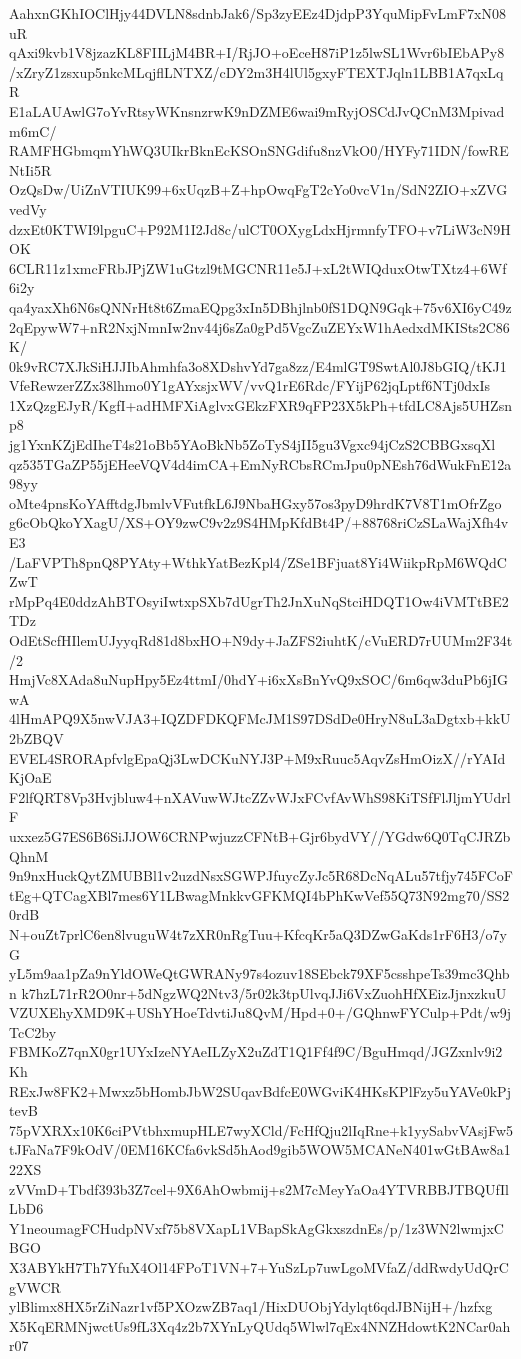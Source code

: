 AahxnGKhIOClHjy44DVLN8sdnbJak6/Sp3zyEEz4DjdpP3YquMipFvLmF7xN08uR
qAxi9kvb1V8jzazKL8FIILjM4BR+I/RjJO+oEceH87iP1z5lwSL1Wvr6bIEbAPy8
/xZryZ1zsxup5nkcMLqjflLNTXZ/cDY2m3H4lUl5gxyFTEXTJqln1LBB1A7qxLqR
E1aLAUAwlG7oYvRtsyWKnsnzrwK9nDZME6wai9mRyjOSCdJvQCnM3Mpivadm6mC/
RAMFHGbmqmYhWQ3UIkrBknEcKSOnSNGdifu8nzVkO0/HYFy71IDN/fowRENtIi5R
OzQsDw/UiZnVTIUK99+6xUqzB+Z+hpOwqFgT2cYo0vcV1n/SdN2ZIO+xZVGvedVy
dzxEt0KTWI9lpguC+P92M1I2Jd8c/ulCT0OXygLdxHjrmnfyTFO+v7LiW3cN9HOK
6CLR11z1xmcFRbJPjZW1uGtzl9tMGCNR11e5J+xL2tWIQduxOtwTXtz4+6Wf6i2y
qa4yaxXh6N6sQNNrHt8t6ZmaEQpg3xIn5DBhjlnb0fS1DQN9Gqk+75v6XI6yC49z
2qEpywW7+nR2NxjNmnIw2nv44j6sZa0gPd5VgcZuZEYxW1hAedxdMKISts2C86K/
0k9vRC7XJkSiHJJIbAhmhfa3o8XDshvYd7ga8zz/E4mlGT9SwtAl0J8bGIQ/tKJ1
VfeRewzerZZx38lhmo0Y1gAYxsjxWV/vvQ1rE6Rdc/FYijP62jqLptf6NTj0dxIs
1XzQzgEJyR/KgfI+adHMFXiAglvxGEkzFXR9qFP23X5kPh+tfdLC8Ajs5UHZsnp8
jg1YxnKZjEdIheT4s21oBb5YAoBkNb5ZoTyS4jII5gu3Vgxc94jCzS2CBBGxsqXl
qz535TGaZP55jEHeeVQV4d4imCA+EmNyRCbsRCmJpu0pNEsh76dWukFnE12a98yy
oMte4pnsKoYAfftdgJbmlvVFutfkL6J9NbaHGxy57os3pyD9hrdK7V8T1mOfrZgo
g6cObQkoYXagU/XS+OY9zwC9v2z9S4HMpKfdBt4P/+88768riCzSLaWajXfh4vE3
/LaFVPTh8pnQ8PYAty+WthkYatBezKpl4/ZSe1BFjuat8Yi4WiikpRpM6WQdCZwT
rMpPq4E0ddzAhBTOsyiIwtxpSXb7dUgrTh2JnXuNqStciHDQT1Ow4iVMTtBE2TDz
OdEtScfHIlemUJyyqRd81d8bxHO+N9dy+JaZFS2iuhtK/cVuERD7rUUMm2F34t/2
HmjVc8XAda8uNupHpy5Ez4ttmI/0hdY+i6xXsBnYvQ9xSOC/6m6qw3duPb6jIGwA
4lHmAPQ9X5nwVJA3+IQZDFDKQFMcJM1S97DSdDe0HryN8uL3aDgtxb+kkU2bZBQV
EVEL4SRORApfvlgEpaQj3LwDCKuNYJ3P+M9xRuuc5AqvZsHmOizX//rYAIdKjOaE
F2lfQRT8Vp3Hvjbluw4+nXAVuwWJtcZZvWJxFCvfAvWhS98KiTSfFlJljmYUdrlF
uxxez5G7ES6B6SiJJOW6CRNPwjuzzCFNtB+Gjr6bydVY//YGdw6Q0TqCJRZbQhnM
9n9nxHuckQytZMUBBl1v2uzdNsxSGWPJfuycZyJc5R68DcNqALu57tfjy745FCoF
tEg+QTCagXBl7mes6Y1LBwagMnkkvGFKMQI4bPhKwVef55Q73N92mg70/SS20rdB
N+ouZt7prlC6en8lvuguW4t7zXR0nRgTuu+KfcqKr5aQ3DZwGaKds1rF6H3/o7yG
yL5m9aa1pZa9nYldOWeQtGWRANy97s4ozuv18SEbck79XF5csshpeTs39mc3Qhbn
k7hzL71rR2O0nr+5dNgzWQ2Ntv3/5r02k3tpUlvqJJi6VxZuohHfXEizJjnxzkuU
VZUXEhyXMD9K+UShYHoeTdvtiJu8QvM/Hpd+0+/GQhnwFYCulp+Pdt/w9jTcC2by
FBMKoZ7qnX0gr1UYxIzeNYAeILZyX2uZdT1Q1Ff4f9C/BguHmqd/JGZxnlv9i2Kh
RExJw8FK2+Mwxz5bHombJbW2SUqavBdfcE0WGviK4HKsKPlFzy5uYAVe0kPjtevB
75pVXRXx10K6ciPVtbhxmupHLE7wyXCld/FcHfQju2lIqRne+k1yySabvVAsjFw5
tJFaNa7F9kOdV/0EM16KCfa6vkSd5hAod9gib5WOW5MCANeN401wGtBAw8a122XS
zVVmD+Tbdf393b3Z7cel+9X6AhOwbmij+s2M7cMeyYaOa4YTVRBBJTBQUfIlLbD6
Y1neoumagFCHudpNVxf75b8VXapL1VBapSkAgGkxszdnEs/p/1z3WN2lwmjxCBGO
X3ABYkH7Th7YfuX4Ol14FPoT1VN+7+YuSzLp7uwLgoMVfaZ/ddRwdyUdQrCgVWCR
ylBlimx8HX5rZiNazr1vf5PXOzwZB7aq1/HixDUObjYdylqt6qdJBNijH+/hzfxg
X5KqERMNjwctUs9fL3Xq4z2b7XYnLyQUdq5Wlwl7qEx4NNZHdowtK2NCar0ahr07
